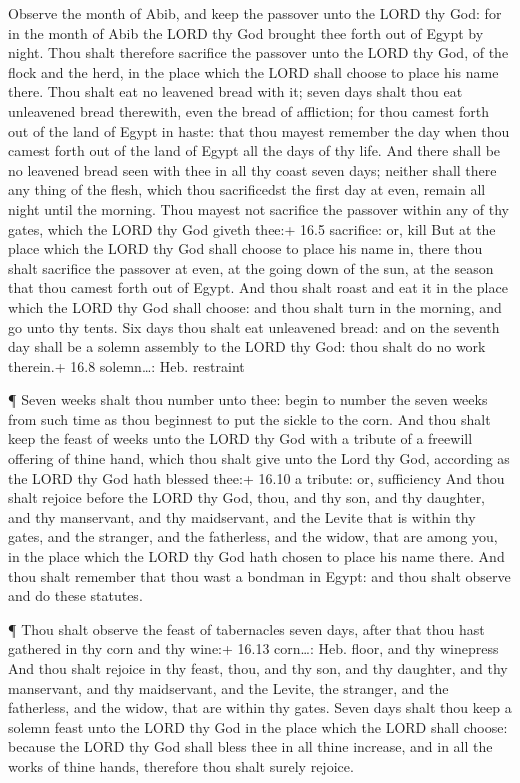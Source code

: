  Observe the month of Abib, and keep the passover unto the
LORD thy God: for in the month of Abib the LORD thy God brought thee
forth out of Egypt by night.  Thou shalt therefore sacrifice
the passover unto the LORD thy God, of the flock and the herd, in the
place which the LORD shall choose to place his name there. 
Thou shalt eat no leavened bread with it; seven days shalt thou eat
unleavened bread therewith, even the bread of affliction; for thou
camest forth out of the land of Egypt in haste: that thou mayest
remember the day when thou camest forth out of the land of Egypt all the
days of thy life.  And there shall be no leavened bread seen
with thee in all thy coast seven days; neither shall there any thing of
the flesh, which thou sacrificedst the first day at even, remain all
night until the morning.  Thou mayest not sacrifice the
passover within any of thy gates, which the LORD thy God giveth thee:+
16.5 sacrifice: or, kill  But at the place which the LORD
thy God shall choose to place his name in, there thou shalt sacrifice
the passover at even, at the going down of the sun, at the season that
thou camest forth out of Egypt.  And thou shalt roast and
eat it in the place which the LORD thy God shall choose: and thou shalt
turn in the morning, and go unto thy tents.  Six days thou
shalt eat unleavened bread: and on the seventh day shall be a solemn
assembly to the LORD thy God: thou shalt do no work therein.+ 16.8
solemn\ldots: Heb. restraint

 ¶ Seven weeks shalt thou number unto thee: begin to number
the seven weeks from such time as thou beginnest to put the sickle to
the corn.  And thou shalt keep the feast of weeks unto the
LORD thy God with a tribute of a freewill offering of thine hand, which
thou shalt give unto the Lord thy God, according as the LORD thy God
hath blessed thee:+ 16.10 a tribute: or, sufficiency  And
thou shalt rejoice before the LORD thy God, thou, and thy son, and thy
daughter, and thy manservant, and thy maidservant, and the Levite that
is within thy gates, and the stranger, and the fatherless, and the
widow, that are among you, in the place which the LORD thy God hath
chosen to place his name there.  And thou shalt remember
that thou wast a bondman in Egypt: and thou shalt observe and do these
statutes.

 ¶ Thou shalt observe the feast of tabernacles seven days,
after that thou hast gathered in thy corn and thy wine:+ 16.13
corn\ldots: Heb. floor, and thy winepress  And thou shalt
rejoice in thy feast, thou, and thy son, and thy daughter, and thy
manservant, and thy maidservant, and the Levite, the stranger, and the
fatherless, and the widow, that are within thy gates. 
Seven days shalt thou keep a solemn feast unto the LORD thy God in the
place which the LORD shall choose: because the LORD thy God shall bless
thee in all thine increase, and in all the works of thine hands,
therefore thou shalt surely rejoice.

